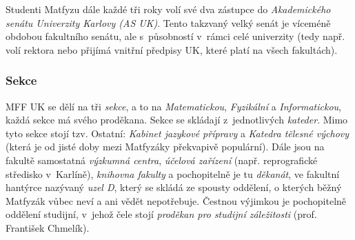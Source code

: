 Studenti Matfyzu dále každé tři roky volí své dva zástupce do {\it Akademického senátu Univerzity Karlovy (AS UK)}. Tento takzvaný velký senát je víceméně obdobou fakultního senátu, ale s~působností v~rámci celé univerzity (tedy např. volí rektora nebo přijímá vnitřní předpisy UK, které platí na všech fakultách).

\subsubsection{Sekce}


MFF UK se dělí na tři {\it sekce}, a to na {\it Matematickou}, {\it Fyzikální} a {\it Informatickou}, každá sekce má svého proděkana.  Sekce se skládají z~jednotlivých {\it kateder}. Mimo tyto sekce stojí tzv. Ostatní: {\it Kabinet jazykové přípravy} a {\it Katedra tělesné výchovy} (která je od jisté doby mezi Matfyzáky pře\-kva\-pi\-vě populární).  Dále jsou na fakultě samostatná {\it výzkumná centra}, {\it účelová zařízení} (např. reprografické středisko v~Karlíně), {\it knihovna fakulty} a pochopitelně je tu {\it děkanát}, ve fakultní hantýrce nazývaný {\it uzel D}, který se skládá ze spousty oddělení, o kterých běžný Matfyzák vůbec neví a ani vědět nepotřebuje. Čestnou výjimkou je pochopitelně oddělení studijní, v~jehož čele stojí {\it proděkan pro studijní záležitosti} (prof. František Chmelík).
